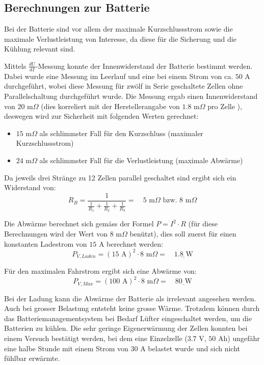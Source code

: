 \subsection{Berechnungen zur Batterie}
Bei der Batterie sind vor allem der maximale Kurzschlussstrom sowie die maximale Verlustleistung von Interesse, da diese für die Sicherung und die Kühlung relevant sind.

Mittels $\frac{dU}{dI}$-Messung konnte der Innenwiderstand der Batterie bestimmt werden. Dabei wurde eine Messung im Leerlauf und eine bei einem Strom von ca. $50$ A durchgeführt, wobei diese Messung für zwölf in Serie geschaltete Zellen ohne Parallelschaltung durchgeführt wurde. Die Messung ergab einen Innenwiderstand von $20$ m$\Omega$ (dies korreliert mit der Herstellerangabe von $1.8$ m$\Omega$ pro Zelle \cite{lev50}), deswegen wird zur Sicherheit mit folgenden Werten gerechnet:
\begin{itemize}
	\item $15$ m$\Omega$ als schlimmster Fall für den Kurzschluss (maximaler Kurzschlussstrom)
	\item $24$ m$\Omega$ als schlimmster Fall für die Verlustleistung (maximale Abwärme)
\end{itemize}

Da jeweils drei Stränge zu 12 Zellen parallel geschaltet sind ergibt sich ein Widerstand von:
\begin{equation*}
	R_B=\frac{1}{\frac{1}{R_1}+\frac{1}{R_2}+\frac{1}{R_3}}=\quad 5\text{ m}\Omega\text{ bzw. } 8\text{ m}\Omega
\end{equation*}

Die Abwärme berechnet sich gemäss der Formel $P=I^2\cdot R$ (für diese Berechnungen wird der Wert von $8$ m$\Omega$ benützt), dies soll zuerst für einen konstanten Ladestrom von $15$ A berechnet werden:
\begin{equation*}
	P_{V,Laden}=\left(15\text{ A}\right)^2\cdot8\text{ m}\Omega=\quad\underline{1.8\text{ W}}
\end{equation*}

Für den maximalen Fahrstrom ergibt sich eine Abwärme von:
\begin{equation*}
	P_{V,Max}=\left(100\text{ A}\right)^2\cdot8\text{ m}\Omega=\quad\underline{80\text{ W}}
\end{equation*}

Bei der Ladung kann die Abwärme der Batterie als irrelevant angesehen werden. Auch bei grosser Belastung entsteht keine grosse Wärme. Trotzdem können durch das Batteriemanagementsystem bei Bedarf Lüfter eingeschaltet werden, um die Batterien zu kühlen. Die sehr geringe Eigenerwärmung der Zellen konnten bei einem Versuch bestätigt werden, bei dem eine Einzelzelle ($3.7$ V, $50$ Ah) ungefähr eine halbe Stunde mit einem Strom von $30$ A belastet wurde und sich nicht fühlbar erwärmte.

